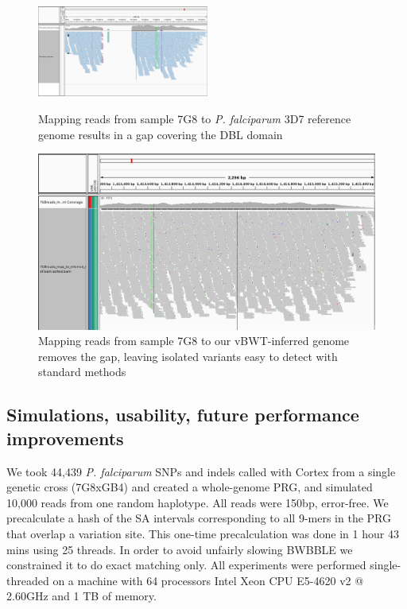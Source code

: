 \documentclass[runningheads,a4paper]{llncs}
\begin{document}
\begin{figure}
  \centering
  \begin{minipage}[b]{0.4\textwidth}
    \includegraphics[height=3cm]{7G8_to_3D7_pileup.png}
    \caption{Mapping reads from sample 7G8 to \textit{P. falciparum} 3D7 reference genome results in a gap covering the DBL domain}
  \end{minipage}
  \hfill
  \begin{minipage}[b]{0.45\textwidth}
    \includegraphics[width=\textwidth]{7G8_to_inf_ref_pileup.png}
    \caption{Mapping reads from sample 7G8 to our vBWT-inferred genome removes the gap, leaving isolated variants easy to detect with standard methods }
  \end{minipage}
\end{figure}










\subsection{Simulations, usability, future performance improvements}

We  took 44,439  \textit{P. falciparum} SNPs and indels called with Cortex from a single genetic cross (7G8xGB4) \cite{miles} and created a whole-genome PRG, and simulated 10,000 reads from one random haplotype. All reads were 150bp, error-free. We precalculate a hash of the SA intervals corresponding to all 9-mers in the PRG that overlap a variation site. This one-time precalculation was done in 1 hour 43 mins using 25 threads. In order to avoid unfairly slowing BWBBLE we constrained it to do exact matching only.  All experiments were performed single-threaded on a machine with 64 processors Intel Xeon CPU E5-4620 v2 @ 2.60GHz and 1 TB of memory.
\end{document}
